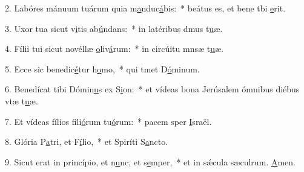 2. Labóres mánuum tuárum quia m\uline{a}nduc\uline{á}bis:~* beátus es, et bene tbi \uline{e}rit.\par 
3. Uxor tua sicut v\uline{i}tis ab\uline{ú}ndans:~* in latéribus dmus t\uline{u}æ.\par 
4. Fílii tui sicut novéllæ \uline{o}liv\uline{á}rum:~* in circúitu mnsæ t\uline{u}æ.\par 
5. Ecce sic benedic\uline{é}tur h\uline{o}mo,~* qui tmet D\uline{ó}minum.\par 
6. Benedícat tibi Dómin\uline{u}s ex S\uline{i}on:~* et vídeas bona Jerúsalem ómnibus diébus vtæ t\uline{u}æ.\par 
7. Et vídeas fílios fili\uline{ó}rum tu\uline{ó}rum:~* pacem sper \uline{I}sraël.\par 
8. Glória P\uline{a}tri, et F\uline{í}lio,~* et Spiríti S\uline{a}ncto.\par 
9. Sicut erat in princípio, et n\uline{u}nc, et s\uline{e}mper,~* et in sǽcula sæculrum. \uline{A}men.\par 
